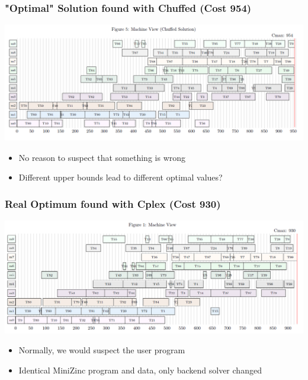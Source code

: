 \documentclass[dvipsnames,aspectratio=169]{beamer}
\begin{document}
\begin{frame}
\frametitle{"Optimal" Solution found with Chuffed (Cost 954)}
\includegraphics[width=14cm]{images/mt10machineschuffed.PNG}
\begin{itemize}
    \item No reason to suspect that something is wrong
    \item Different upper bounds lead to different optimal values?
\end{itemize}   
\end{frame}

\begin{frame}[label=mt10optimum]
\frametitle{Real Optimum found with Cplex (Cost 930)}
\includegraphics[width=14cm]{images/mt10machinescplex.PNG}
\begin{itemize}
\item Normally, we would suspect the user program
    \item Identical MiniZinc program and data, only backend solver changed
\end{itemize}
\end{frame}
\end{document}
